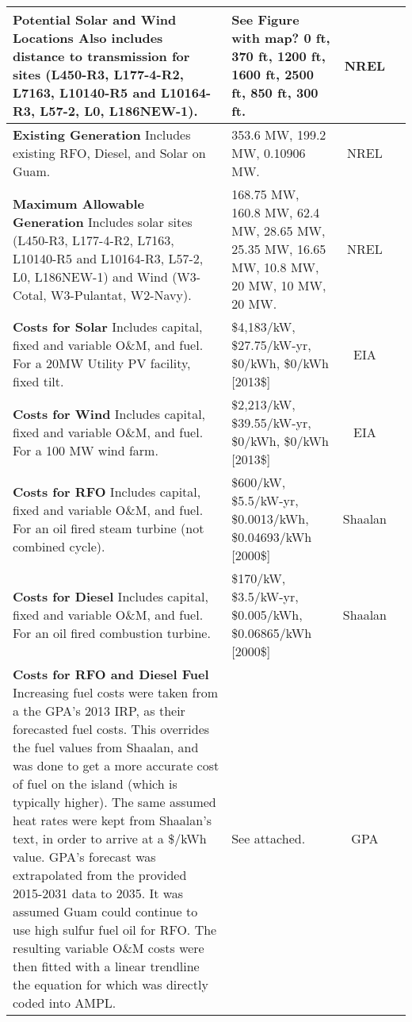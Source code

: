 \documentclass[12pt,letterpaper,fleqn]{report}
\begin{document}
\begin{center}
\begin{longtable}{| p{10cm} | p{4cm} | c | c | }
    \textbf{Potential Solar and Wind Locations} Also includes distance
    to transmission for sites (L450-R3, L177-4-R2, L7163, L10140-R5
    and L10164-R3, L57-2, L0, L186NEW-1). & See Figure with map? 0 ft,
    370 ft, 1200 ft, 1600 ft, 2500 ft, 850 ft, 300 ft. & NREL &
    \cite{misty} \\\hline

    \textbf{Existing Generation} Includes existing RFO, Diesel, and
    Solar on Guam. & 353.6 MW, 199.2 MW, 0.10906 MW. & NREL &
    \cite{misty} \\\hline

    \textbf{Maximum Allowable Generation} Includes solar sites
    (L450-R3, L177-4-R2, L7163, L10140-R5 and L10164-R3, L57-2, L0,
    L186NEW-1) and Wind (W3-Cotal, W3-Pulantat, W2-Navy). & 168.75 MW,
    160.8 MW, 62.4 MW, 28.65 MW, 25.35 MW, 16.65 MW, 10.8 MW, 20 MW,
    10 MW, 20 MW. & NREL & \cite{misty} \\\hline

    \textbf{Costs for Solar} Includes capital, fixed and variable
    O\&M, and fuel. For a 20MW Utility PV facility, fixed tilt. &
    \$4,183/kW, \$27.75/kW-yr, \$0/kWh, \$0/kWh [2013\$] & EIA &
    \cite{eia13} \\\hline

    \textbf{Costs for Wind} Includes capital, fixed and variable O\&M,
    and fuel. For a 100 MW wind farm. & \$2,213/kW, \$39.55/kW-yr,
    \$0/kWh, \$0/kWh [2013\$] & EIA & \cite{eia13} \\\hline

    \textbf{Costs for RFO} Includes capital, fixed and variable O\&M,
    and fuel. For an oil fired steam turbine (not combined cycle). &
    \$600/kW, \$5.5/kW-yr, \$0.0013/kWh, \$0.04693/kWh [2000\$] &
    Shaalan & \cite{shaalan01} \\\hline

    \textbf{Costs for Diesel} Includes capital, fixed and variable
    O\&M, and fuel. For an oil fired combustion turbine. & \$170/kW,
    \$3.5/kW-yr, \$0.005/kWh, \$0.06865/kWh [2000\$] & Shaalan &
    \cite{shaalan01} \\\hline

    \textbf{Costs for RFO and Diesel Fuel} Increasing fuel costs were
    taken from a the GPA's 2013 IRP, as their forecasted fuel
    costs. This overrides the fuel values from Shaalan, and was done
    to get a more accurate cost of fuel on the island (which is
    typically higher). The same assumed heat rates were kept from
    Shaalan's text, in order to arrive at a \$/kWh value. GPA's
    forecast was extrapolated from the provided 2015-2031 data to
    2035. It was assumed Guam could continue to use high sulfur fuel
    oil for RFO. The resulting variable O\&M costs were then fitted
    with a linear trendline the equation for which was directly coded
    into AMPL. & See attached. & GPA & \cite{cruz13} \\\hline


\end{longtable}
\end{center}
\end{document}
